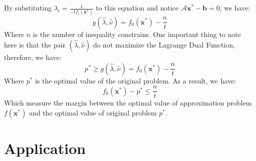 \documentclass[10pt,a4paper]{article}
\begin{document}
By substituting $\hat{\lambda}_{i} =  \frac{1}{-tf_{i}(\mathbf{x}^{*})}$ to this equation and notice $\mathcal{A} \mathbf{x}^{*} - \mathbf{b} = 0$, we have:
\begin{equation*}
	g(\hat{\lambda}, \hat{\nu}) = f_{0}(\mathbf{x^{*}}) - \frac{n}{t}
\end{equation*}
Where $n$ is the number of inequality constrains. One important thing to note here is that the pair $(\hat{\lambda}, \hat{\nu})$ do not maximize the Lagrange Dual Function, therefore, we have:
\begin{equation*}
	p^{*} \geq g(\hat{\lambda}, \hat{\nu}) = f_{0}(\mathbf{x^{*}}) - \frac{n}{t}
\end{equation*}
Where $p^{*}$ is the optimal value of the original problem. As a result, we have:
\begin{equation*}
	f_{0}(\mathbf{x^{*}}) - p^{*} \leq \frac{n}{t}
\end{equation*}
Which measure the margin between the optimal value of approximation problem $f(\mathbf{x}^{*})$ and the optimal value of original problem $p^{*}$.
\section{Application}
\end{document}
